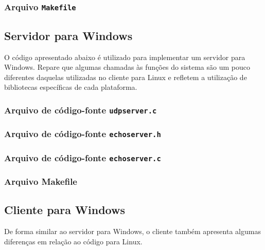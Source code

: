 \documentclass[12pt]{article}
\begin{document}
\subsubsection{Arquivo \texttt{Makefile}}



\subsection{Servidor para Windows}

O código apresentado abaixo é utilizado para implementar um servidor para Windows.
Repare que algumas chamadas às funções do sistema são um pouco diferentes daquelas
utilizadas no cliente para Linux e refletem a utilização de bibliotecas específicas
de cada plataforma.

\subsubsection{Arquivo de código-fonte \texttt{udpserver.c}}



\subsubsection{Arquivo de código-fonte \texttt{echoserver.h}}



\subsubsection{Arquivo de código-fonte \texttt{echoserver.c}}



\subsubsection{Arquivo Makefile}



\subsection{Cliente para Windows}

De forma similar ao servidor para Windows, o cliente também apresenta algumas
diferenças em relação ao código para Linux.
\end{document}
